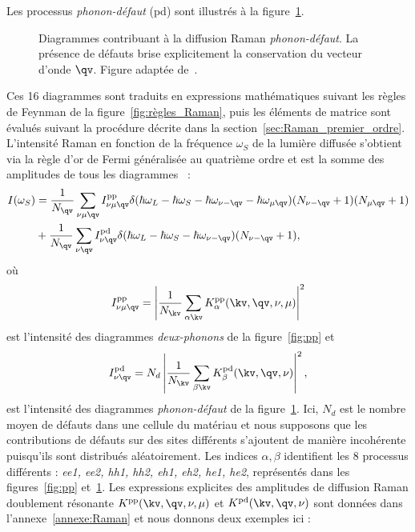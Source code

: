 Les processus \textit{phonon-défaut} (pd) sont illustrés à la figure~\ref{fig:pd}.
\begin{figure}[htbp]
    \centering
    
    \caption[Diagrammes contribuant à la diffusion Raman \textit{phonon-défaut}]{Diagrammes contribuant à la diffusion Raman \textit{phonon-défaut}. La présence de défauts brise explicitement la conservation du vecteur d'onde $\qv$. Figure adaptée de~\cite{venezuelaTheoryDoubleresonantRaman2011}.}
    \label{fig:pd}
\end{figure}
Ces 16 diagrammes sont traduits en expressions mathématiques suivant les règles de Feynman de la figure~\ref{fig:règles_Raman}, puis les éléments de matrice sont évalués suivant la procédure décrite dans la section~\ref{sec:Raman_premier_ordre}. L'intensité Raman en fonction de la fréquence $\omega_S$ de la lumière diffusée s'obtient via la règle d'or de Fermi généralisée au quatrième ordre et est la somme des amplitudes de tous les diagrammes~\cite{venezuelaTheoryDoubleresonantRaman2011,graziottoTheoryInfraredDoubleresonance2024} : 
\begin{equation}
    \begin{split}
    I(\omega_S) &= \frac{1}{N_\qv}\sum_{\nu\mu\qv}I^{\text{pp}}_{\nu\mu\qv}\delta(\hbar\omega_L-\hbar\omega_S-\hbar\omega_{\nu-\qv}-\hbar\omega_{\mu\qv})(N_{\nu-\qv}+1)(N_{\mu\qv}+1)\\
    &+ \frac{1}{N_\qv}\sum_{\nu\qv}I^{\text{pd}}_{\nu\qv}\delta(\hbar\omega_L-\hbar\omega_S-\hbar\omega_{\nu-\qv})(N_{\nu-\qv}+1),
    \end{split}\label{eqn:Raman_2nd}
\end{equation}
où
\begin{equation}
    I^{\text{pp}}_{\nu\mu\qv} = \left|\frac{1}{N_\kv}\sum_{\alpha\kv}K^{\text{pp}}_\alpha(\kv,\qv,\nu,\mu)\right|^2\label{eqn:I_pp}
\end{equation} 
est l'intensité des diagrammes \textit{deux-phonons} de la figure~\ref{fig:pp} et
\begin{equation}
    I^{\text{pd}}_{\nu\qv} = N_d\left|\frac{1}{N_\kv}\sum_{\beta\kv}K^{\text{pd}}_\beta (\kv,\qv,\nu)\right|^2,\label{eqn:I_pd}
\end{equation}
est l'intensité des diagrammes \textit{phonon-défaut} de la figure~\ref{fig:pd}. Ici, $N_d$ est le nombre moyen de défauts dans une cellule du matériau et nous supposons que les contributions de défauts sur des sites différents s'ajoutent de manière incohérente puisqu'ils sont distribués aléatoirement. Les indices $\alpha,\beta$ identifient les 8 processus différents : \textit{ee1, ee2, hh1, hh2, eh1, eh2, he1, he2}, représentés dans les figures~\ref{fig:pp} et~\ref{fig:pd}. Les expressions explicites des amplitudes de diffusion Raman doublement résonante $K^{\text{pp}}(\kv,\qv,\nu,\mu)$ et $K^{\text{pd}}(\kv,\qv,\nu)$ sont données dans l'annexe~\ref{annexe:Raman} et nous donnons deux exemples ici :

